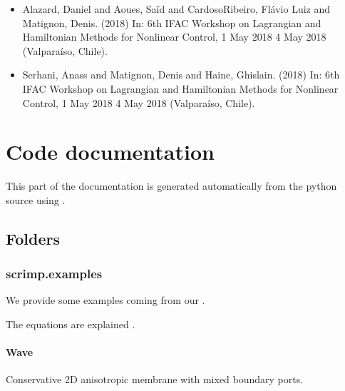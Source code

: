 \documentclass[letterpaper,10pt,english]{sphinxmanual}
\begin{document}
\begin{itemize}
\item {} 
\sphinxAtStartPar
Alazard, Daniel and Aoues, Saïd and Cardoso\sphinxhyphen{}Ribeiro, Flávio Luiz and Matignon, Denis.  (2018) In: 6th IFAC Workshop on Lagrangian and Hamiltonian Methods for Nonlinear Control, 1 May 2018 \sphinxhyphen{} 4 May 2018 (Valparaíso, Chile).

\item {} 
\sphinxAtStartPar
Serhani, Anass and Matignon, Denis and Haine, Ghislain.  (2018) In: 6th IFAC Workshop on Lagrangian and Hamiltonian Methods for Nonlinear Control, 1 May 2018 \sphinxhyphen{} 4 May 2018 (Valparaíso, Chile).

\end{itemize}

\sphinxstepscope


\section{Code documentation}
\label{\detokenize{scrimp:code-documentation}}\label{\detokenize{scrimp::doc}}
\sphinxAtStartPar
This part of the documentation is generated automatically from the python source using .


\subsection{Folders}
\label{\detokenize{scrimp:folders}}
\sphinxstepscope


\subsubsection{scrimp.examples}
\label{\detokenize{scrimp.examples:scrimp-examples}}\label{\detokenize{scrimp.examples::doc}}
\sphinxAtStartPar
We provide some examples coming from our .

\sphinxAtStartPar
The equations are explained .


\paragraph{Wave}
\label{\detokenize{scrimp.examples:wave}}
\sphinxAtStartPar
Conservative 2D anisotropic membrane with mixed boundary ports.
\end{document}
